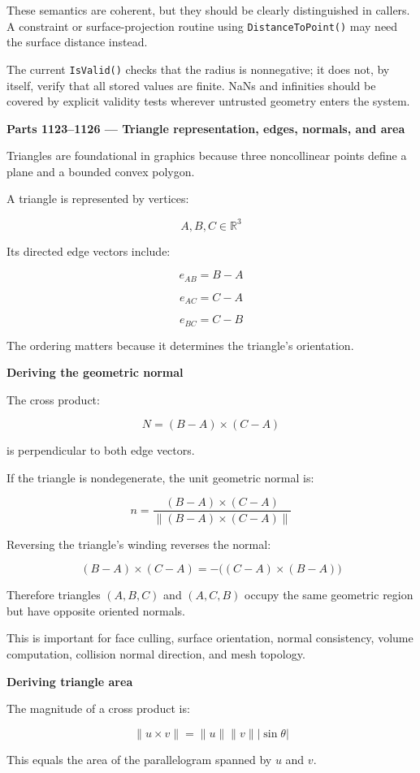 These semantics are coherent, but they should be clearly distinguished in callers. A constraint or surface-projection routine using \texttt{DistanceToPoint()} may need the surface distance instead.

The current \texttt{IsValid()} checks that the radius is nonnegative; it does not, by itself, verify that all stored values are finite. NaNs and infinities should be covered by explicit validity tests wherever untrusted geometry enters the system.

\textbf{Parts 1123--1126 --- Triangle representation, edges, normals, and area}

Triangles are foundational in graphics because three noncollinear points define a plane and a bounded convex polygon.

A triangle is represented by vertices:

\[
A,B,C\in\mathbb R^3
\]

Its directed edge vectors include:

\[
e_{AB}=B-A
\]

\[
e_{AC}=C-A
\]

\[
e_{BC}=C-B
\]

The ordering matters because it determines the triangle's orientation.

\textbf{Deriving the geometric normal}

The cross product:

\[
N=(B-A)\times(C-A)
\]

is perpendicular to both edge vectors.

If the triangle is nondegenerate, the unit geometric normal is:

\[
\boxed{ n=\frac{(B-A)\times(C-A)} {\|(B-A)\times(C-A)\|} }
\]

Reversing the triangle's winding reverses the normal:

\[
(B-A)\times(C-A) = -\big((C-A)\times(B-A)\big)
\]

Therefore triangles \((A,B,C)\) and \((A,C,B)\) occupy the same geometric region but have opposite oriented normals.

This is important for face culling, surface orientation, normal consistency, volume computation, collision normal direction, and mesh topology.

\textbf{Deriving triangle area}

The magnitude of a cross product is:

\[
\|u\times v\|=\|u\|\|v\||\sin\theta|
\]

This equals the area of the parallelogram spanned by \(u\) and \(v\).

